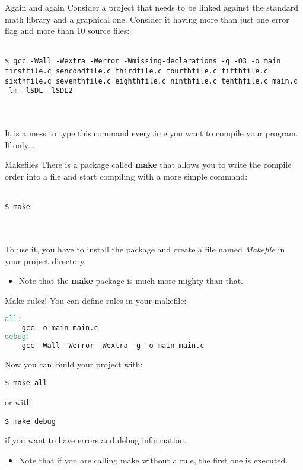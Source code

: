 \begin{frame}[fragile]{Again and again}
	Consider a project that needs to be linked against the standard math library and a graphical one. Consider it having more than just one error flag and more than 10 source files:\\\ \\
	\begin{lstlisting}[numbers=none]
$ gcc -Wall -Wextra -Werror -Wmissing-declarations -g -O3 -o main firstfile.c sencondfile.c thirdfile.c fourthfile.c fifthfile.c sixthfile.c seventhfile.c eighthfile.c ninthfile.c tenthfile.c main.c -lm -lSDL -lSDL2
\end{lstlisting}\ \\\ \\
	It is a mess to type this command everytime you want to compile your program.\\
	If only...
\end{frame}

\begin{frame}[fragile]{Makefiles}
	There is a package called \textbf{make} that allows you to write the compile order into a file and start compiling with a more simple command:\\\ \\
	\begin{lstlisting}[numbers=none]
$ make
\end{lstlisting}\ \\\ \\
	To use it, you have to install the package and create a file named \textit{Makefile} in your project directory.\\
	\begin{itemize}
		\item Note that the \textbf{make} package is much more mighty than that.
	\end{itemize}
\end{frame}

\begin{frame}[fragile]{Make rulez!}
	You can define rules in your makefile:
	\begin{lstlisting}[language=make,basicstyle=\scriptsize,numbers=none]
all:
	gcc -o main main.c
debug:
	gcc -Wall -Werror -Wextra -g -o main main.c
\end{lstlisting}
	Now you can Build your project with:
	\begin{lstlisting}[basicstyle=\scriptsize,numbers=none]
$ make all
\end{lstlisting}
	or with
	\begin{lstlisting}[basicstyle=\scriptsize,numbers=none]
$ make debug
\end{lstlisting}
	if you want to have errors and debug information.
	\begin{itemize}
		\item Note that if you are calling make without a rule, the first one is executed.
	\end{itemize}
\end{frame}

